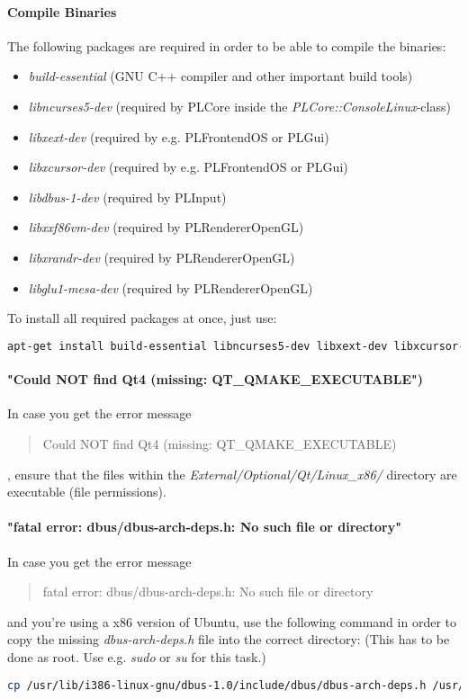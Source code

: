 \paragraph{Compile Binaries}
The following packages are required in order to be able to compile the binaries:
\begin{itemize}
\item{\emph{build-essential} (GNU C++ compiler and other important build tools)}
\item{\emph{libncurses5-dev} (required by PLCore inside the \emph{PLCore::ConsoleLinux}-class)}
\item{\emph{libxext-dev} (required by e.g. PLFrontendOS or PLGui)}
\item{\emph{libxcursor-dev} (required by e.g. PLFrontendOS or PLGui)}
\item{\emph{libdbus-1-dev} (required by PLInput)}
\item{\emph{libxxf86vm-dev} (required by PLRendererOpenGL)}
\item{\emph{libxrandr-dev} (required by PLRendererOpenGL)}
\item{\emph{libglu1-mesa-dev} (required by PLRendererOpenGL)}
\end{itemize}

To install all required packages at once, just use:
\begin{lstlisting}[language=sh]
apt-get install build-essential libncurses5-dev libxext-dev libxcursor-dev libdbus-1-dev libxxf86vm-dev libxrandr-dev libglu1-mesa-dev
\end{lstlisting}


\paragraph{"Could NOT find Qt4 (missing: QT\_QMAKE\_EXECUTABLE")}
In case you get the error message \begin{quote}Could NOT find Qt4 (missing: QT\_QMAKE\_EXECUTABLE)\end{quote}, ensure that the files within the \emph{External/Optional/Qt/Linux\_x86/} directory are executable (file permissions).


\paragraph{"fatal error: dbus/dbus-arch-deps.h: No such file or directory"}
In case you get the error message \begin{quote}fatal error: dbus/dbus-arch-deps.h: No such file or directory\end{quote} and you're using a x86 version of Ubuntu, use the following command in order to copy the missing \emph{dbus-arch-deps.h} file into the correct directory: (This has to be done as root. Use e.g. \emph{sudo} or \emph{su} for this task.)
\begin{lstlisting}[language=sh]
cp /usr/lib/i386-linux-gnu/dbus-1.0/include/dbus/dbus-arch-deps.h /usr/include/dbus-1.0/dbus
\end{lstlisting}


